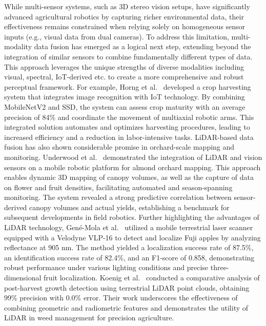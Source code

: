 \documentclass[a4paper,fleqn]{cas-dc}
\begin{document}
While multi-sensor systems, such as 3D stereo vision setups, have significantly advanced agricultural robotics by capturing richer environmental data, their effectiveness remains constrained when relying solely on homogeneous sensor inputs (e.g., visual data from dual cameras). To address this limitation, multi-modality data fusion has emerged as a logical next step, extending beyond the integration of similar sensors to combine fundamentally different types of data. This approach leverages the unique strengths of diverse modalities including visual, spectral, IoT-derived etc. to create a more comprehensive and robust perceptual framework.
For example, Horng et al.~\cite{horng2019smart} developed a crop harvesting system that integrates image recognition with IoT technology. By combining MobileNetV2 and SSD, the system can assess crop maturity with an average precision of 84\% and coordinate the movement of multiaxial robotic arms. This integrated solution automates and optimizes harvesting procedures, leading to increased efficiency and a reduction in labor-intensive tasks.
LiDAR-based data fusion has also shown considerable promise in orchard-scale mapping and monitoring. Underwood et al.~\cite{underwood2016mapping} demonstrated the integration of LiDAR and vision sensors on a mobile robotic platform for almond orchard mapping. This approach enables dynamic 3D mapping of canopy volumes, as well as the capture of data on flower and fruit densities, facilitating automated and season-spanning monitoring. The system revealed a strong predictive correlation between sensor-derived canopy volumes and actual yields, establishing a benchmark for subsequent developments in field robotics.
Further highlighting the advantages of LiDAR technology, Gené-Mola et al.~\cite{gene2019fruit} utilized a mobile terrestrial laser scanner equipped with a Velodyne VLP-16 to detect and localize Fuji apples by analyzing reflectance at 905 nm. The method yielded a localization success rate of 87.5\%, an identification success rate of 82.4\%, and an F1-score of 0.858, demonstrating robust performance under various lighting conditions and precise three-dimensional fruit localization. Koenig et al.~\cite{koenig2015comparative} conducted a comparative analysis of post-harvest growth detection using terrestrial LiDAR point clouds, obtaining 99\% precision with 0.0\% error. Their work underscores the effectiveness of combining geometric and radiometric features and demonstrates the utility of LiDAR in weed management for precision agriculture.
\end{document}
